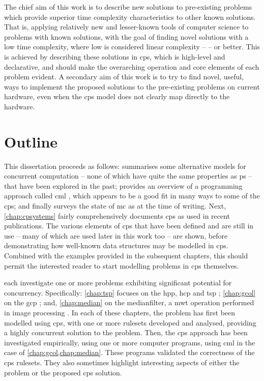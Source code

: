The chief aim of this work is to describe new solutions to pre-existing problems which provide superior time complexity characteristics to other known solutions.  That is, applying relatively new and lesser-known tools of computer science to problems with known solutions, with the goal of finding novel solutions with a low time complexity, where low is considered linear complexity --  -- or better.  
This is achieved by describing these solutions in \gls{cps}, which is high-level and declarative, and should make the overarching operation and core elements of each problem evident.
A secondary aim of this work is to try to find novel, useful, ways to implement the proposed solutions to the pre-existing problems on current hardware, even when the \gls{cps} model does not clearly map directly to the hardware.  

\section{Outline}

This dissertation proceeds as follows:  summarises some alternative models for concurrent computation -- none of which have quite the same properties as \gls{ps} -- that have been explored in the past; provides an overview of a programming approach called \gls{cml} \cite{Reppy2007,Reppy1991}, which appears to be a good fit in many ways to some of the \gls{cps}; and finally surveys the state of \gls{mc} as at the time of writing.  Next, \cref{chap:cpsystems} fairly comprehensively documents \gls{cps} as used in recent publications.  The various elements of \gls{cps} that have been defined and are still in use -- many of which are used later in this work too -- are shown, before demonstrating how well-known data structures may be modelled in \gls{cps}.  Combined with the examples provided in the subsequent chapters, this should permit the interested reader to start modelling problems in \gls{cps} themselves.

 each investigate one or more problems exhibiting significant potential for concurrency.  Specifically: \cref{chap:tsp} focuses on the \gls{hpp}, \gls{hcp} and \gls{tsp} \cite{Applegate2006,Cook2012}; \cref{chap:gcol} on the \gls{gcp} \cite{Lewis2016}; and, \cref{chap:median} on the \gls{medianfilter}, a \gls{mwt} operation performed in image processing \cite{Fisher2016,Gimelfarb2018}.  In each of these chapters, the problem has first been modelled using \gls{cps}, with one or more \glspl{ruleset} developed and analysed, providing a highly concurrent solution to the problem.  Then, the \gls{cps} approach has been investigated empirically, using one or more computer programs, using \gls{cml} in the case of \cref{chap:gcol,chap:median}.  These programs validated the correctness of the \gls{cps} \glspl{ruleset}.  They also sometimes highlight interesting aspects of either the problem or the proposed \gls{cps} solution.

